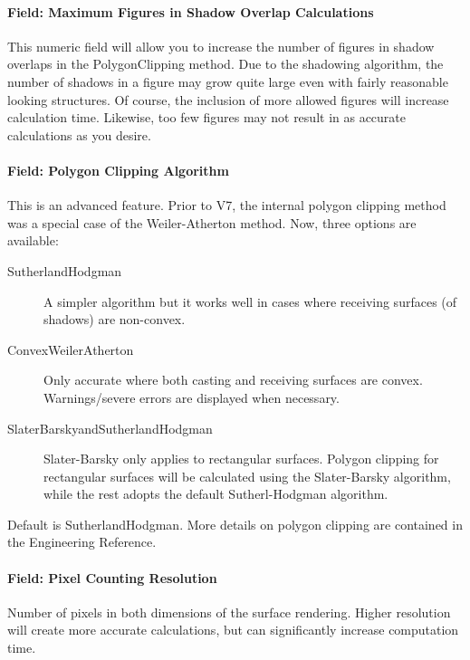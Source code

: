 \paragraph{Field: Maximum Figures in Shadow Overlap Calculations}\label{field-maximum-figures-in-shadow-overlap-calculations}

This numeric field will allow you to increase the number of figures in shadow overlaps in the PolygonClipping method. Due to the shadowing algorithm, the number of shadows in a figure may grow quite large even with fairly reasonable looking structures. Of course, the inclusion of more allowed figures will increase calculation time. Likewise, too few figures may not result in as accurate calculations as you desire.

\paragraph{Field: Polygon Clipping Algorithm}\label{field-polygon-clipping-algorithm}

This is an advanced feature. Prior to V7, the internal polygon clipping method was a special case of the Weiler-Atherton method. Now, three options are available:

\begin{description}
  \item[SutherlandHodgman] A simpler algorithm but it works well in cases where receiving surfaces (of shadows) are non-convex.
  \item[ConvexWeilerAtherton] Only accurate where both casting and receiving surfaces are convex. Warnings/severe errors are displayed when necessary.
  \item[SlaterBarskyandSutherlandHodgman] Slater-Barsky only applies to rectangular surfaces. Polygon clipping for rectangular surfaces will be calculated using the Slater-Barsky algorithm, while the rest adopts the default Sutherl-Hodgman algorithm.
\end{description}

Default is SutherlandHodgman. More details on polygon clipping are contained in the Engineering Reference.

\paragraph{Field: Pixel Counting Resolution}

Number of pixels in both dimensions of the surface rendering. Higher resolution will create more accurate calculations, but can significantly increase computation time.

